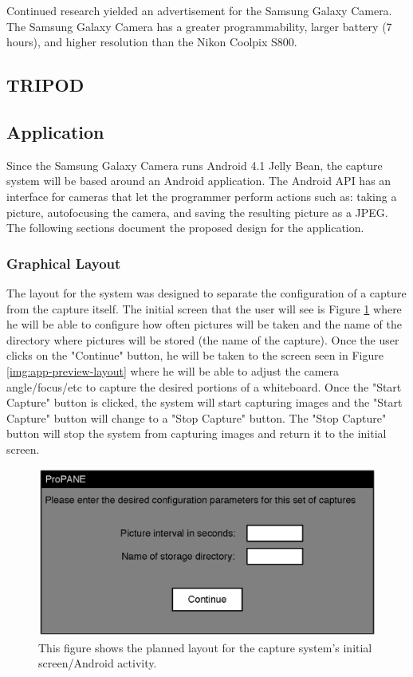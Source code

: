 \documentclass[]{article}
\begin{document}
					Continued research yielded an advertisement for the Samsung Galaxy Camera. The Samsung Galaxy Camera has a greater programmability, larger battery (7 hours), and higher resolution than the Nikon Coolpix S800.
				
			\subsection{TRIPOD}
			
			
			\subsection{Application}
				Since the Samsung Galaxy Camera runs Android 4.1 Jelly Bean, the capture system will be based around an Android application. The Android API has an interface for cameras that let the programmer perform actions such as: taking a picture, autofocusing the camera, and saving the resulting picture as a JPEG. The following sections document the proposed design for the application.
				
				\subsubsection{Graphical Layout}
					The layout for the system was designed to separate the configuration of a capture from the capture itself. The initial screen that the user will see is Figure \ref{img:app-main-layout} where he will be able to configure how often pictures will be taken and the name of the directory where pictures will be stored (the name of the capture). Once the user clicks on the "Continue" button, he will be taken to the screen seen in Figure \ref{img:app-preview-layout} where he will be able to adjust the camera angle/focus/etc to capture the desired portions of a whiteboard. Once the "Start Capture" button is clicked, the system will start capturing images and the "Start Capture" button will change to a "Stop Capture" button. The "Stop Capture" button will stop the system from capturing images and return it to the initial screen. 
					
					\begin{figure}
						\centering
						\includegraphics{images/app-main-layout.eps}
						\caption{This figure shows the planned layout for the capture system's initial screen/Android activity.}
						\label{img:app-main-layout}
					\end{figure}
					
\end{document}
